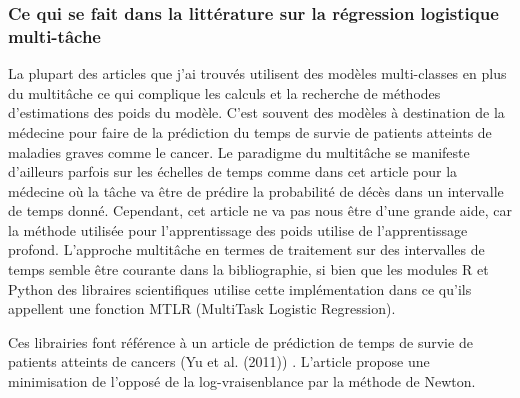 \documentclass[12pt]{article}
\begin{document}
\subsubsection{Ce qui se fait dans la littérature sur la régression logistique multi-tâche}
La plupart des articles que j'ai trouvés utilisent des modèles multi-classes en plus du multitâche ce qui complique les calculs et la recherche de méthodes d'estimations des poids du modèle. C'est souvent des modèles à destination de la médecine pour faire de la prédiction du temps de survie de patients atteints de maladies graves comme le cancer. Le paradigme du multitâche se manifeste d'ailleurs parfois sur les échelles de temps comme dans cet article pour la médecine \cite{MT-LR-1} où la tâche va être de prédire la probabilité de décès dans un intervalle de temps donné. Cependant, cet article ne va pas nous être d'une grande aide, car la méthode utilisée pour l'apprentissage des poids utilise de l'apprentissage profond. 
L'approche multitâche en termes de traitement sur des intervalles de temps semble être courante dans la bibliographie, si bien que les modules R et Python des libraires scientifiques utilise cette implémentation dans ce qu'ils appellent une fonction MTLR (MultiTask Logistic Regression).

Ces librairies font référence à un article de prédiction de temps de survie de patients atteints de cancers (Yu et al. (2011)) \cite{Cancer-survival-rate}. L'article propose une minimisation de l'opposé de la log-vraisenblance par la méthode de Newton.
\end{document}
